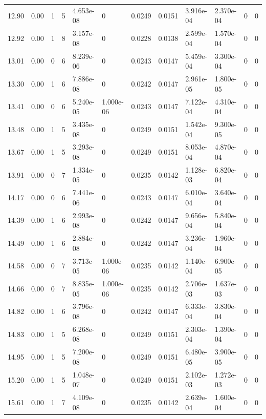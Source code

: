 \documentclass[preview]{standalone}
\begin{document}
{{{\begin{tabular}{L{1.2cm}C{1.2cm} C{0.3cm}C{0.5cm} C{1.4cm}C{1.4cm} C{1.4cm}C{1.4cm} C{1.6cm}C{1.6cm} C{1.6cm}C{1.6cm}}
  12.90  &  0.00  & 1     &  5 &  4.653e-08  & 0  &  0.0249&   0.0151& 3.916e-04 & 2.370e-04   &  0 & 0  \\ 
  12.92  &  0.00  & 1     &  8 &  3.157e-08  & 0  &  0.0228&   0.0138& 2.599e-04 & 1.570e-04   &  0 & 0  \\ 
  13.01  &  0.00  & 0     &  6 &  8.239e-06  & 0  &  0.0243&   0.0147& 5.459e-04 & 3.300e-04   &  0 & 0  \\ 
  13.30  &  0.00  & 1     &  6 &  7.886e-08  & 0  &  0.0242&   0.0147& 2.961e-05 & 1.800e-05   &  0 & 0  \\ 
  13.41  &  0.00  & 0     &  6 &  5.240e-05  & 1.000e-06  &  0.0243&   0.0147& 7.122e-04 & 4.310e-04   &  0 & 0  \\ 
  13.48  &  0.00  & 1     &  5 &  3.435e-08  & 0  &  0.0249&   0.0151& 1.542e-04 & 9.300e-05   &  0 & 0  \\ 
  13.67  &  0.00  & 1     &  5 &  3.293e-08  & 0  &  0.0249&   0.0151& 8.053e-04 & 4.870e-04   &  0 & 0  \\ 
  13.91  &  0.00  & 0     &  7 &  1.334e-05  & 0  &  0.0235&   0.0142& 1.128e-03 & 6.820e-04   &  0 & 0  \\ 
  14.17  &  0.00  & 0     &  6 &  7.441e-06  & 0  &  0.0243&   0.0147& 6.010e-04 & 3.640e-04   &  0 & 0  \\ 
  14.39  &  0.00  & 1     &  6 &  2.993e-08  & 0  &  0.0242&   0.0147& 9.656e-04 & 5.840e-04   &  0 & 0  \\ 
  14.49  &  0.00  & 1     &  6 &  2.884e-08  & 0  &  0.0242&   0.0147& 3.236e-04 & 1.960e-04   &  0 & 0  \\ 
  14.58  &  0.00  & 0     &  7 &  3.713e-05  & 1.000e-06  &  0.0235&   0.0142& 1.140e-04 & 6.900e-05   &  0 & 0  \\ 
  14.66  &  0.00  & 0     &  7 &  8.835e-05  & 1.000e-06  &  0.0235&   0.0142& 2.706e-03 & 1.637e-03   &  0 & 0  \\ 
  14.82  &  0.00  & 1     &  6 &  3.796e-08  & 0  &  0.0242&   0.0147& 6.333e-04 & 3.830e-04   &  0 & 0  \\ 
  14.83  &  0.00  & 1     &  5 &  6.268e-08  & 0  &  0.0249&   0.0151& 2.303e-04 & 1.390e-04   &  0 & 0  \\ 
  14.95  &  0.00  & 1     &  5 &  7.200e-08  & 0  &  0.0249&   0.0151& 6.480e-05 & 3.900e-05   &  0 & 0  \\ 
  15.20  &  0.00  & 1     &  5 &  1.048e-07  & 0  &  0.0249&   0.0151& 2.102e-03 & 1.272e-03   &  0 & 0  \\ 
  15.61  &  0.00  & 1     &  7 &  4.109e-08  & 0  &  0.0235&   0.0142& 2.639e-04 & 1.600e-04   &  0 & 0  \\ 

\end{tabular}}}}
\end{document}
